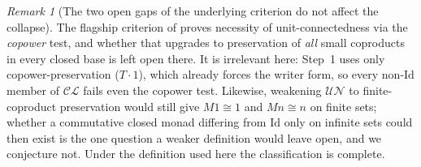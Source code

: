 \documentclass[11pt]{amsart}
\theoremstyle{plain}
\theoremstyle{definition}
\theoremstyle{remark}
\newtheorem{remark}[theorem]{Remark}
\newcommand{\Id}{\mathrm{Id}}
\newcommand{\CL}{\mathcal{CL}}
\newcommand{\UN}{\mathcal{UN}}
\begin{document}
\begin{remark}[The two open gaps of the underlying criterion do not affect the collapse]
The flagship criterion of \cite{MacBethBase} proves necessity of unit-connectedness via the
\emph{copower} test, and whether that upgrades to preservation of \emph{all} small coproducts in every
closed base is left open there. It is irrelevant here: Step~1 uses only copower-preservation ($T\cdot
1$), which already forces the writer form, so every non-$\Id$ member of $\CL$ fails even the copower
test. Likewise, weakening $\UN$ to finite-coproduct preservation would still give $M1\cong1$ and
$Mn\cong n$ on finite sets; whether a commutative closed monad differing from $\Id$ only on infinite
sets could then exist is the one question a weaker definition would leave open, and we conjecture not.
Under the definition used here the classification is complete.
\end{remark}
\end{document}
